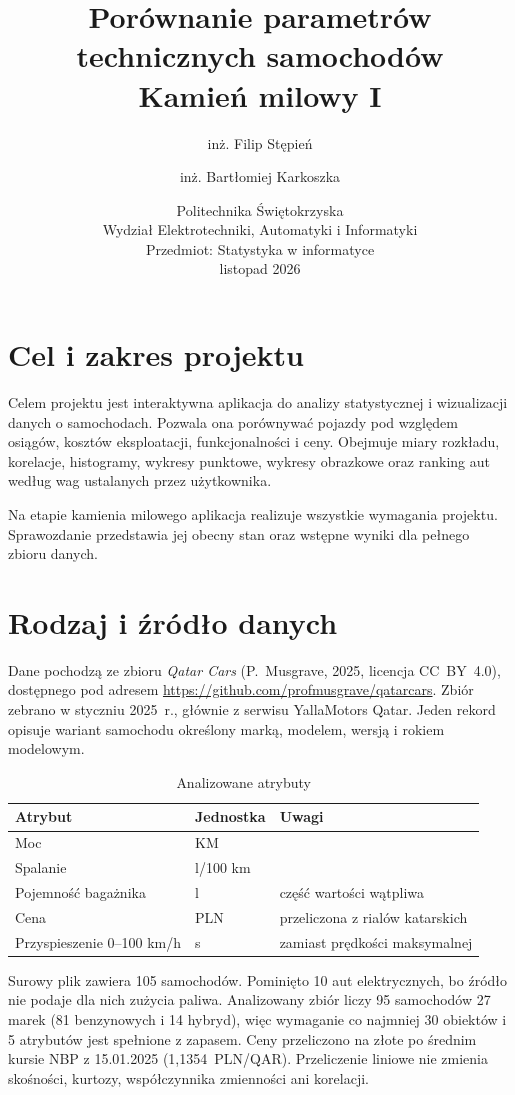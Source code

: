 \documentclass[11pt,a4paper]{article}
\title{Porównanie parametrów technicznych samochodów\\[4pt]
\large Kamień milowy I}
\author{inż. Filip Stępień \and inż. Bartłomiej Karkoszka}
\date{Politechnika Świętokrzyska\\
Wydział Elektrotechniki, Automatyki i Informatyki\\
Przedmiot: Statystyka w informatyce\\[8pt]
listopad 2026}
\begin{document}
\maketitle

\section{Cel i zakres projektu}

Celem projektu jest interaktywna aplikacja do analizy statystycznej i wizualizacji danych
o samochodach. Pozwala ona porównywać pojazdy pod względem osiągów, kosztów eksploatacji,
funkcjonalności i ceny. Obejmuje miary rozkładu, korelacje, histogramy, wykresy punktowe,
wykresy obrazkowe oraz ranking aut według wag ustalanych przez użytkownika.

Na etapie kamienia milowego aplikacja realizuje wszystkie wymagania projektu.
Sprawozdanie przedstawia jej obecny stan oraz wstępne wyniki dla pełnego zbioru danych.

\section{Rodzaj i źródło danych}

Dane pochodzą ze zbioru \emph{Qatar Cars} (P.~Musgrave, 2025, licencja CC~BY~4.0),
dostępnego pod adresem \url{https://github.com/profmusgrave/qatarcars}. Zbiór zebrano
w styczniu 2025~r., głównie z serwisu YallaMotors Qatar. Jeden rekord opisuje wariant
samochodu określony marką, modelem, wersją i rokiem modelowym.

\begin{table}[H]
\centering
\begin{tabular}{lll}
\toprule
Atrybut & Jednostka & Uwagi \\
\midrule
Moc & KM & \\
Spalanie & l/100 km & \\
Pojemność bagażnika & l & część wartości wątpliwa \\
Cena & PLN & przeliczona z rialów katarskich \\
Przyspieszenie 0--100 km/h & s & zamiast prędkości maksymalnej \\
\bottomrule
\end{tabular}
\caption{Analizowane atrybuty}
\end{table}

Surowy plik zawiera 105 samochodów. Pominięto 10 aut elektrycznych, bo źródło nie podaje
dla nich zużycia paliwa. Analizowany zbiór liczy 95 samochodów 27 marek (81 benzynowych
i 14 hybryd), więc wymaganie co najmniej 30 obiektów i 5 atrybutów jest spełnione
z zapasem. Ceny przeliczono na złote po średnim kursie NBP z 15.01.2025
(1,1354~PLN/QAR). Przeliczenie liniowe nie zmienia skośności, kurtozy, współczynnika
zmienności ani korelacji.
\end{document}
